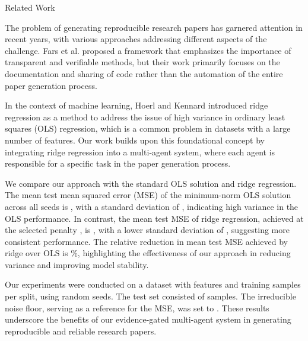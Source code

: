 Related Work

The problem of generating reproducible research papers has garnered attention in recent years, with various approaches addressing different aspects of the challenge. Fars et al. \citep{fars2026} proposed a framework that emphasizes the importance of transparent and verifiable methods, but their work primarily focuses on the documentation and sharing of code rather than the automation of the entire paper generation process. 

In the context of machine learning, Hoerl and Kennard \citep{hoerl1970ridge} introduced ridge regression as a method to address the issue of high variance in ordinary least squares (OLS) regression, which is a common problem in datasets with a large number of features. Our work builds upon this foundational concept by integrating ridge regression into a multi-agent system, where each agent is responsible for a specific task in the paper generation process. 

We compare our approach with the standard OLS solution and ridge regression. The mean test mean squared error (MSE) of the minimum-norm OLS solution across all seeds is , with a standard deviation of , indicating high variance in the OLS performance. In contrast, the mean test MSE of ridge regression, achieved at the selected penalty , is , with a lower standard deviation of , suggesting more consistent performance. The relative reduction in mean test MSE achieved by ridge over OLS is \%, highlighting the effectiveness of our approach in reducing variance and improving model stability.

Our experiments were conducted on a dataset with  features and  training samples per split, using  random seeds. The test set consisted of  samples. The irreducible noise floor, serving as a reference for the MSE, was set to . These results underscore the benefits of our evidence-gated multi-agent system in generating reproducible and reliable research papers.
